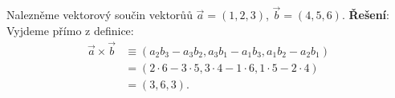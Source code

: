 \begin{mdframed}[style=mdexam]
  \begin{example}\label{fyz:exam027}
    Nalezněme vektorový součin vektorůů \(\vec{a} = (1, 2, 3)\), \(\vec{b} = (4, 5, 6)\).
    \newline
    \textbf{Řešení}: Vyjdeme přímo z definice:
    \begin{align*}
      \vec{a}\times\vec{b} 
        &\equiv  (a_2b_3−a_3b_2, a_3b_1−a_1b_3, a_1b_2−a_2b_1)                      \\
        &= (2\cdot6-3\cdot5, 3\cdot4-1\cdot6, 1\cdot5-2\cdot4)                      \\
        &= (3, 6, 3). 
    \end{align*}
  \end{example}
\end{mdframed}